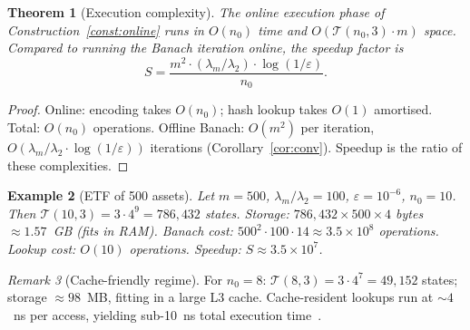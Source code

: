 \documentclass[twocolumn,11pt,a4paper]{article}
\newtheorem{theorem}{Theorem}[section]
\newtheorem{example}[theorem]{Example}
\theoremstyle{remark}
\newtheorem{remark}[theorem]{Remark}
\newcommand{\lam}[1]{\lambda_{#1}}
\newcommand{\T}{\mathcal{T}}
\begin{document}
\begin{theorem}[Execution complexity]
\label{thm:exec}
The online execution phase of Construction~\ref{const:online} runs in $O(n_0)$ time
and $O(\T(n_0,3)\cdot m)$ space. Compared to running the Banach iteration online,
the speedup factor is
\begin{equation}
  S = \frac{m^2 \cdot (\lam{m}/\lam{2}) \cdot \log(1/\varepsilon)}{n_0}.
\end{equation}
\end{theorem}

\begin{proof}
Online: encoding takes $O(n_0)$; hash lookup takes $O(1)$ amortised.
Total: $O(n_0)$ operations.
Offline Banach: $O(m^2)$ per iteration, $O(\lam{m}/\lam{2}\cdot\log(1/\varepsilon))$
iterations (Corollary~\ref{cor:conv}).
Speedup is the ratio of these complexities.
\end{proof}

\begin{example}[ETF of 500 assets]
\label{ex:speedup}
Let $m=500$, $\lam{m}/\lam{2}=100$, $\varepsilon=10^{-6}$, $n_0=10$.
Then $\T(10,3) = 3\cdot 4^9 = 786{,}432$ states.
Storage: $786{,}432\times 500\times 4$ bytes $\approx 1.57$~GB (fits in RAM).
Banach cost: $500^2\cdot 100\cdot 14 \approx 3.5\times 10^8$ operations.
Lookup cost: $O(10)$ operations.
Speedup: $S \approx 3.5\times 10^7$.
\end{example}

\begin{remark}[Cache-friendly regime]
For $n_0=8$: $\T(8,3) = 3\cdot 4^7 = 49{,}152$ states;
storage $\approx 98$~MB, fitting in a large L3 cache.
Cache-resident lookups run at $\sim 4$~ns per access,
yielding sub-10~ns total execution time~\cite{drepper2007}.
\end{remark}
\end{document}
